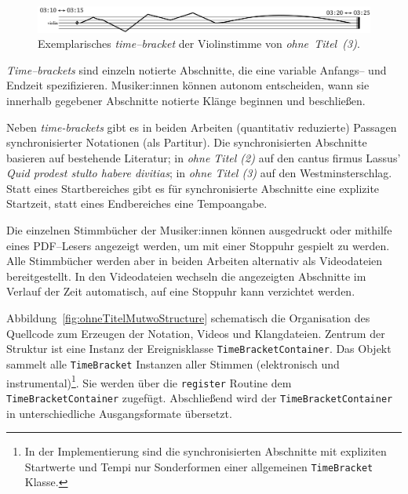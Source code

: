 \documentclass[12pt,a4paper,ngerman]{article}
\begin{document}
\bigskip

\begin{figure}[h!]
    \begin{center}
        \includegraphics[scale=0.25]{pictures/time-bracket-ohne-titel-3-2.png}
    \end{center}
    \caption{%
        Exemplarisches \emph{time--bracket} der Violinstimme von \emph{ohne~Titel~(3)}.
    }
\end{figure}


\emph{Time--brackets} sind einzeln notierte Abschnitte, die eine variable Anfangs-- und Endzeit spezifizieren.
Musiker:innen können autonom entscheiden, wann sie innerhalb gegebener Abschnitte notierte Klänge beginnen und beschließen.


\bigskip

Neben \emph{time-brackets} gibt es in beiden Arbeiten (quantitativ reduzierte) Passagen synchronisierter Notationen (als Partitur).
Die synchronisierten Abschnitte basieren auf bestehende Literatur; in \emph{ohne Titel (2)} auf den cantus firmus Lassus' \emph{Quid prodest stulto habere divitias}; in \emph{ohne Titel (3)} auf den Westminsterschlag.
Statt eines Startbereiches gibt es für synchronisierte Abschnitte eine explizite Startzeit, statt eines Endbereiches eine Tempoangabe.

\bigskip

Die einzelnen Stimmbücher der Musiker:innen können ausgedruckt oder mithilfe eines PDF--Lesers angezeigt werden, um mit einer Stoppuhr gespielt zu werden.
Alle Stimmbücher werden aber in beiden Arbeiten alternativ als Videodateien bereitgestellt.
In den Videodateien wechseln die angezeigten Abschnitte im Verlauf der Zeit automatisch, auf eine Stoppuhr kann verzichtet werden.

\bigskip

Abbildung~\ref{fig:ohneTitelMutwoStructure} schematisch die Organisation des Quellcode zum Erzeugen der Notation, Videos und Klangdateien.
Zentrum der Struktur ist eine Instanz der Ereignisklasse \texttt{TimeBracketContainer}.
Das Objekt sammelt alle \texttt{TimeBracket} Instanzen aller Stimmen (elektronisch und instrumental)\footnote{%
    In der Implementierung sind die synchronisierten Abschnitte mit expliziten Startwerte und Tempi nur Sonderformen einer allgemeinen \texttt{TimeBracket} Klasse.
}.
Sie werden über die \texttt{register} Routine dem \texttt{TimeBracketContainer} zugefügt.
Abschließend wird der \texttt{TimeBracketContainer} in unterschiedliche Ausgangsformate übersetzt.
\end{document}
